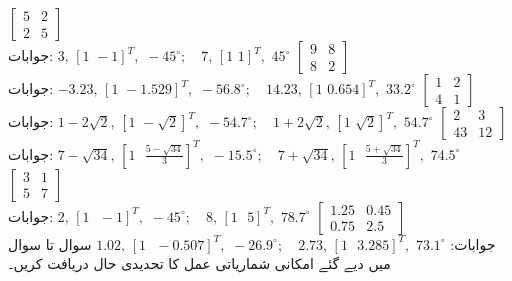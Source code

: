 \quad
$\begin{bmatrix} 5&2\\2&5 \end{bmatrix}$\\
جوابات:
$3,\, [1\,\,-1]^T, \,\,-45^{\circ};\quad 7,\,[1\,\,1]^T,\,\,45^{\circ}$
\quad
$\begin{bmatrix} 9&8\\8&2 \end{bmatrix}$\\
جوابات:
$-3.23,\, [1\,\,-1.529]^T, \,\,-56.8^{\circ};\quad 14.23,\,[1\,\,0.654]^T,\,\,33.2^{\circ}$
\quad
$\begin{bmatrix} 1&2\\4&1 \end{bmatrix}$\\
جوابات:
$1-2\sqrt{2},\, [1\,\,-\sqrt{2}]^T, \,\,-54.7^{\circ};\quad 1+2\sqrt{2},\,[1\,\,\sqrt{2}]^T,\,\,54.7^{\circ}$
\quad
$\begin{bmatrix} 2&3\\43&12 \end{bmatrix}$\\
جوابات:
$7-\sqrt{34},\, [1\,\,\,\,\tfrac{5-\sqrt{34}}{3}]^T, \,\,-15.5^{\circ};\quad 7+\sqrt{34},\,[1\,\,\,\,\tfrac{5+\sqrt{34}}{3}]^T,\,\,74.5^{\circ}$
\quad
$\begin{bmatrix} 3&1\\5&7 \end{bmatrix}$\\
جوابات:
$2,\, [1\,\,\,\,-1]^T, \,\,-45^{\circ};\quad 8,\,[1\,\,\,\,5]^T,\,\,78.7^{\circ}$
\quad
$\begin{bmatrix} 1.25&0.45\\0.75&2.5 \end{bmatrix}$\\
جوابات:
$1.02,\, [1\,\,\,\,-0.507]^T, \,\,-26.9^{\circ};\quad 2.73,\,[1\,\,\,\,3.285]^T,\,\,73.1^{\circ}$
سوال  تا سوال  میں دیے گئے امکانی شماریاتی عمل کا تحدیدی  حال دریافت کریں۔

